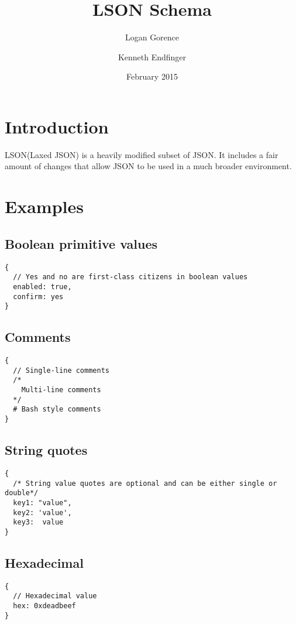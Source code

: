 \documentclass[12pt]{article}
\begin{document}
\title{LSON Schema}
\author{Logan Gorence \and Kenneth Endfinger}
\date{February 2015}
\maketitle
{}
\newpage

\tableofcontents

\newpage

\section{Introduction}
LSON(Laxed JSON) is a heavily modified subset of JSON. It includes a fair amount of changes that allow JSON to be used in a much  broader environment.

\newpage

\section{Examples}
\subsection{Boolean primitive values}
\label{booleanPrimValueExample}
\begin{lstlisting}
{
  // Yes and no are first-class citizens in boolean values
  enabled: true,
  confirm: yes
}
\end{lstlisting}

\subsection{Comments}
\label{commentsExample}
\begin{lstlisting}
{
  // Single-line comments
  /*
    Multi-line comments
  */
  # Bash style comments
}
\end{lstlisting}

\subsection{String quotes}
\label{stringQuotesExample}
\begin{lstlisting}
{
  /* String value quotes are optional and can be either single or double*/
  key1: "value",
  key2: 'value',
  key3:  value
}
\end{lstlisting}

\subsection{Hexadecimal}
\label{hexExample}
\begin{lstlisting}
{
  // Hexadecimal value
  hex: 0xdeadbeef
}
\end{lstlisting}
\end{document}
